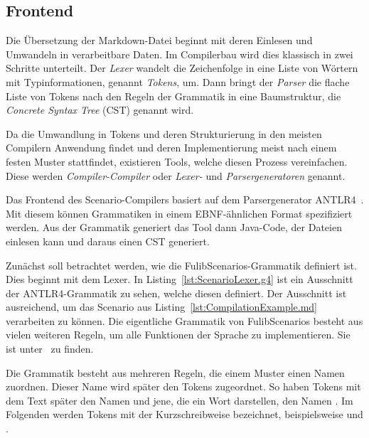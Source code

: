 \subsection{Frontend}\label{subsec:frontend-antlr4}

Die Übersetzung der Markdown-Datei beginnt mit deren Einlesen und Umwandeln in verarbeitbare Daten.
Im Compilerbau wird dies klassisch in zwei Schritte unterteilt.
Der \emph{Lexer} wandelt die Zeichenfolge in eine Liste von Wörtern mit Typinformationen, genannt \emph{Tokens}, um.
Dann bringt der \emph{Parser} die flache Liste von Tokens nach den Regeln der Grammatik in eine Baumstruktur, die \emph{Concrete Syntax Tree} (CST) genannt wird.

Da die Umwandlung in Tokens und deren Strukturierung in den meisten Compilern Anwendung findet und deren Implementierung meist nach einem festen Muster stattfindet, existieren Tools, welche diesen Prozess vereinfachen.
Diese werden \emph{Compiler-Compiler} oder \emph{Lexer-} und \emph{Parsergeneratoren} genannt.

Das Frontend des Scenario-Compilers basiert auf dem Parsergenerator ANTLR4~\cite{antlr4-reference}.
Mit diesem können Grammatiken in einem EBNF-ähnlichen Format spezifiziert werden.
Aus der Grammatik generiert das Tool dann Java-Code, der Dateien einlesen kann und daraus einen CST generiert.

Zunächst soll betrachtet werden, wie die FulibScenarios-Grammatik definiert ist.
Dies beginnt mit dem Lexer.
In Listing~\ref{lst:ScenarioLexer.g4} ist ein Ausschnitt der ANTLR4-Grammatik zu sehen, welche diesen definiert.
Der Ausschnitt ist ausreichend, um das Scenario aus Listing~\ref{lst:CompilationExample.md} verarbeiten zu können.
Die eigentliche Grammatik von FulibScenarios besteht aus vielen weiteren Regeln, um alle Funktionen der Sprache zu implementieren.
Sie ist unter~\cite{lexer-grammar} zu finden.


Die Grammatik besteht aus mehreren Regeln, die einem Muster einen Namen zuordnen.
Dieser Name wird später den Tokens zugeordnet.
So haben Tokens mit dem Text  später den Namen  und jene, die ein Wort darstellen, den Namen .
Im Folgenden werden Tokens mit der Kurzschreibweise  bezeichnet, beispielsweise  und .

